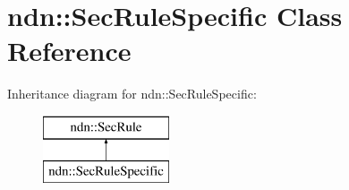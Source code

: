 \hypertarget{classndn_1_1SecRuleSpecific}{}\section{ndn\+:\+:Sec\+Rule\+Specific Class Reference}
\label{classndn_1_1SecRuleSpecific}
Inheritance diagram for ndn\+:\+:Sec\+Rule\+Specific\+:\begin{figure}[H]
\begin{center}
\leavevmode
\includegraphics[height=2.000000cm]{classndn_1_1SecRuleSpecific}
\end{center}
\end{figure}
